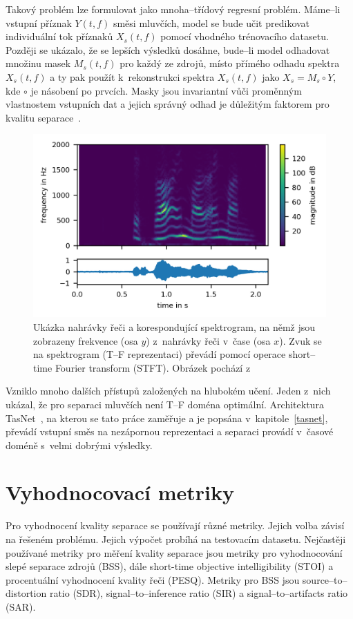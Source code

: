 Takový problém lze formulovat jako mnoha--třídový regresní problém. Máme--li vstupní příznak $Y(t,f)$ směsi mluvčích, model se bude učit predikovat individuální tok příznaků $X_s(t,f)$ pomocí vhodného trénovacího datasetu. Později se ukázalo, že se lepších výsledků dosáhne, bude--li model odhadovat množinu masek $M_s(t,f)$ pro každý ze zdrojů, místo přímého odhadu spektra $X_s(t,f)$ a ty pak použít k~rekonstrukci spektra $X_s(t,f)$ jako $X_s = M_s \circ Y$, kde $\circ$ je násobení po prvcích. Masky jsou invariantní vůči proměnným vlastnostem vstupních dat a jejich správný odhad je důležitým faktorem pro kvalitu separace~\cite{speechseparation}.


\begin{figure}[H]
    \centering
    \includegraphics[scale=1.15]{obrazky-figures/spektrum.png}
    \caption{\label{fig:spektrum}Ukázka nahrávky řeči a korespondující spektrogram, na němž jsou zobrazeny frekvence (osa $y$) z~nahrávky řeči v~čase (osa $x$). Zvuk se na spektrogram (T--F reprezentaci) převádí pomocí operace short--time Fourier transform (STFT). Obrázek pochází z~\cite{speech-spectrogram}}
\end{figure}


Vzniklo mnoho dalších přístupů založených na hlubokém učení. Jeden z~nich ukázal, že pro separaci mluvčích není T--F doména optimální. Architektura TasNet~\cite{luo2018convtasnet}, na kterou se tato práce zaměřuje a je popsána v~kapitole~\ref{tasnet}, převádí vstupní směs na nezápornou reprezentaci a separaci provádí v~časové doméně s~velmi dobrými výsledky.


\section{Vyhodnocovací metriky}
Pro vyhodnocení kvality separace se používají různé metriky. Jejich volba závisí na řešeném problému. Jejich výpočet probíhá na testovacím datasetu. Nejčastěji používané metriky pro měření kvality separace jsou metriky pro vyhodnocování slepé separace zdrojů (BSS), dále short-time objective intelligibility (STOI) a procentuální vyhodnocení kvality řeči (PESQ). Metriky pro BSS jsou source--to--distortion ratio (SDR), signal--to--inference ratio (SIR) a signal--to--artifacts ratio (SAR).


